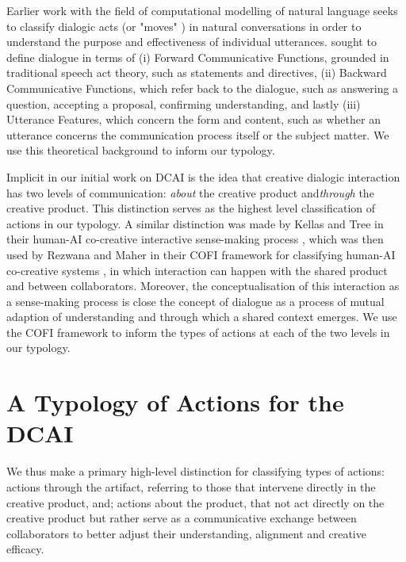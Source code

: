 \documentclass[manuscript,review]{acmart}
\begin{document}
Earlier work with the field of computational modelling of natural language seeks to classify dialogic acts (or "moves" \citep{ginzburg201016}) in natural conversations in order to understand the purpose and effectiveness of individual utterances. \citet{core1997coding} sought to define dialogue in terms of (i) Forward Communicative Functions, grounded in traditional speech act theory, such as statements and directives, (ii) Backward Communicative Functions, which refer back to the dialogue, such as answering a question, accepting a proposal, confirming understanding, and lastly (iii) Utterance Features, which concern the form and content, such as whether an utterance concerns the communication process itself or the subject matter. We use this theoretical background to inform our typology.

Implicit in our initial work on DCAI \citep{bownspeculative2020} is the idea that creative dialogic interaction has two levels of communication: \emph{about} the creative product and\emph{through} the creative product. This distinction serves as the highest level classification of actions in our typology. A similar distinction was made by Kellas and Tree in their human-AI co-creative interactive sense-making process \cite{Kellas2005-lc}, which was then used by Rezwana and Maher in their COFI framework for classifying human-AI co-creative systems \cite{Rezwana_undated-dr}, in which interaction can happen with the shared product and between collaborators. Moreover, the conceptualisation of this interaction as a sense-making process is close the concept of dialogue as a process of mutual adaption of understanding and through which a shared context emerges. We use the COFI framework to inform the types of actions at each of the two levels in our typology. 
    
\section{A Typology of Actions for the DCAI}

We thus make a primary high-level distinction for classifying types of actions: actions through the artifact, referring to those that intervene directly in the creative product, and; actions about the product, that not act directly on the creative product but rather serve as a communicative exchange between collaborators to better adjust their understanding, alignment and creative efficacy. 
\end{document}
